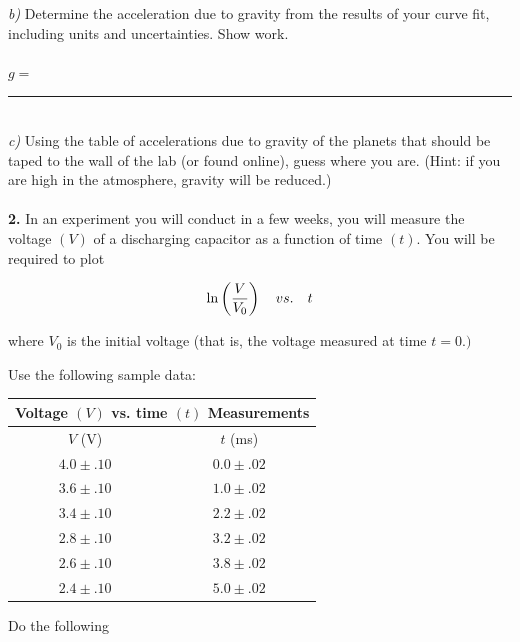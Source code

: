{\it b)} Determine the acceleration due to gravity from the results of 
your curve fit, including
units and uncertainties. Show work. \\
\vspace*{2cm} \\

\hspace{4cm}$g=$\rule{4.0cm}{.1mm}\\

{\it c)} Using the table of accelerations due to gravity of the planets that should be taped to the wall of the lab (or found online), guess where you are. (Hint: if you are high in the atmosphere, gravity will be reduced.) \\
\vspace*{0.8cm} \\

\noindent
{\bf 2.} In an experiment you will conduct in a few weeks, you will measure
the voltage $(V)$ of a discharging capacitor as a function of time $(t).$
You will be required
to plot 

$$
\ln \left( {V \over V_0} \right) \quad vs. \quad t
$$

\noindent
where $V_0$ is the initial voltage (that is, the voltage measured at time 
$t=0.)$

\noindent
Use the following sample data:


\vspace*{0.5cm}
\begin{center}
\begin{tabular}{|c|c|}
\hline
\multicolumn{2}{|c|}{Voltage $(V)$ vs. time $(t)$ Measurements} \\
\hline\hline
$V$ (V) & $t$ (ms) \\
\hline
  $4.0 \pm .10$      &   $ 0.0 \pm .02$   \\
\hline    
  $3.6 \pm .10$      &   $ 1.0 \pm .02$   \\
\hline
  $3.4 \pm .10$     &   $ 2.2 \pm .02$   \\
\hline
  $2.8 \pm .10$     &   $ 3.2 \pm .02$    \\
\hline
  $2.6 \pm .10$     &   $3.8 \pm .02$    \\
\hline
  $2.4 \pm .10$      & $5.0 \pm .02$     \\
\hline

\end{tabular}
\end{center}

\vspace*{0.5cm}
\noindent
Do the following

